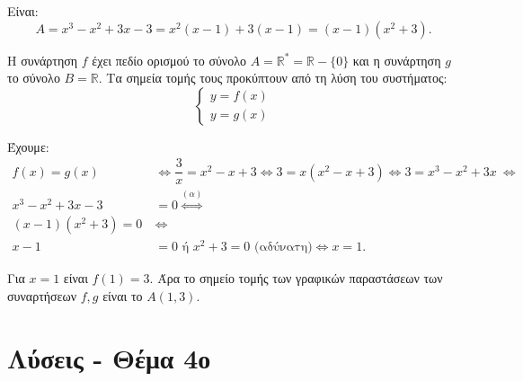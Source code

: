 
\begin{alist}
\item Είναι:
\[A = x^3 - x^2 + 3x - 3 = x^2(x - 1) + 3(x - 1) = (x - 1)(x^2 + 3).\]

\item Η συνάρτηση $f$ έχει πεδίο ορισμού το σύνολο $A = \mathbb{R}^* = \mathbb{R} - \{0\}$ και η συνάρτηση $g$ το σύνολο $B = \mathbb{R}$.
Τα σημεία τομής τους προκύπτουν από τη λύση του συστήματος:
\[\begin{cases} y = f(x) \\ y = g(x) \end{cases}\]

Έχουμε:
\begin{align*}
f(x) = g(x) &\Leftrightarrow \dfrac{3}{x} = x^2 - x + 3 \Leftrightarrow 3 = x(x^2 - x + 3) \Leftrightarrow 3 = x^3 - x^2 + 3x \ \Leftrightarrow \\
x^3 - x^2 + 3x - 3 &= 0 \overset{(\alpha)}{\Leftrightarrow} \\
(x - 1)(x^2 + 3) = 0 \ &\Leftrightarrow \\
x - 1 &= 0 \text{ ή } x^2 + 3 = 0 \text{ (αδύνατη)} \Leftrightarrow x = 1.
\end{align*}

Για $x = 1$ είναι $f(1) = 3$.
Άρα το σημείο τομής των γραφικών παραστάσεων των συναρτήσεων $f, g$ είναι το $A(1, 3)$.
\end{alist}



\newpage
\section{Λύσεις - Θέμα 4ο}

